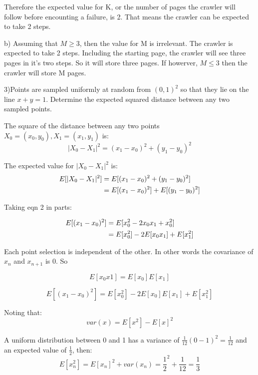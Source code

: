 \documentclass[12pt]{article}
\begin{document}
Therefore the expected value for K, or the number of pages the crawler will 
follow before encounting a failure, is 2. That means the crawler can be
expected to take 2 steps.

b) Assuming that $ M \geq 3$, then the value for M is irrelevant. The crawler 
is expected to take 2 steps. Including the starting page, the crawler will see 
three pages in it's two steps. So it will store three pages. If howerver,
$M \leq 3$ then the crawler will store M pages. 

\pagebreak
\setcounter{equation}{0}
3)Points are sampled uniformly at random from $(0,1)^2$ so that they lie on the 
line $x+y=1$. Determine the expected squared distance between any two sampled 
points. 

The square of the distance between any two points $X_0=(x_0,y_0),X_1=(x_1,y_1)$ is: 
\begin{equation}
    |X_0-X_1|^2 = (x_1-x_0)^2 + (y_1-y_0)^2
\end{equation}

The expected value for $|X_0-X_1|^2$ is: 
\begin{align}
    E[|X_0-X_1|^2] &= E[(x_1-x_0)^2 + (y_1-y_0)^2] \notag \\
                   &= E[(x_1-x_0)^2] + E[(y_1-y_0)^2]
\end{align}

Taking eqn 2 in parts: 

\begin{align}
    E[(x_1-x_0)^2] &= E[x_0^2-2x_0x_1+x_0^2] \notag \\
                   &= E[x_0^2]-2E[x_0x_1]+E[x_1^2]
\end{align}

Each point selection is independent of the other. In other words the covariance 
of $x_n$ and $x_{n+1}$ is 0. So 

\begin{equation}
    E[x_0x1] = E[x_0]E[x_1]
\end{equation}

\begin{equation}
    E[(x_1-x_0)^2] = E[x_0^2]-2E[x_0]E[x_1]+E[x_1^2]
\end{equation}



Noting that: 
\begin{equation}
    var(x) = E[x^2] - E[x]^2
\end{equation}

A uniform distribution between 0 and 1 has a variance of
$\frac{1}{12}(0-1)^2=\frac{1}{12}$ and an expected value of $\frac{1}{2}$, then: 
\begin{equation}
    E[x_n^2] = E[x_n]^2+ var(x_n) = \frac{1}{2}^2 + \frac{1}{12} = \frac{1}{3} 
\end{equation}
\end{document}
